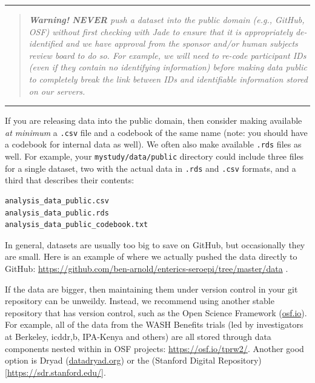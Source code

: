 \documentclass[
]{book}
\begin{document}
\begin{center}\rule{0.5\linewidth}{0.5pt}\end{center}

\begin{quote}
\emph{\textbf{Warning! } \textbf{NEVER} push a dataset into the public domain (e.g., GitHub, OSF) without first checking with Jade to ensure that it is appropriately de-identified and we have approval from the sponsor and/or human subjects review board to do so. For example, we will need to re-code participant IDs (even if they contain no identifying information) before making data public to completely break the link between IDs and identifiable information stored on our servers. }
\end{quote}

\begin{center}\rule{0.5\linewidth}{0.5pt}\end{center}

If you are releasing data into the public domain, then consider making available \emph{at minimum} a \texttt{.csv} file and a codebook of the same name (note: you should have a codebook for internal data as well). We often also make available \texttt{.rds} files as well. For example, your \texttt{mystudy/data/public} directory could include three files for a single dataset, two with the actual data in \texttt{.rds} and \texttt{.csv} formats, and a third that describes their contents:

\begin{verbatim}
analysis_data_public.csv
analysis_data_public.rds
analysis_data_public_codebook.txt
\end{verbatim}

In general, datasets are usually too big to save on GitHub, but occasionally they are small. Here is an example of where we actually pushed the data directly to GitHub: \url{https://github.com/ben-arnold/enterics-seroepi/tree/master/data} .

If the data are bigger, then maintaining them under version control in your git repository can be unweildy. Instead, we recommend using another stable repository that has version control, such as the Open Science Framework (\href{https://osf.io}{osf.io}). For example, all of the data from the WASH Benefits trials (led by investigators at Berkeley, icddr,b, IPA-Kenya and others) are all stored through data components nested within in OSF projects: \url{https://osf.io/tprw2/}. Another good option is Dryad (\href{https://datadryad.org/}{datadryad.org}) or the (Stanford Digital Repository){[}\url{https://sdr.stanford.edu/}{]}.
\end{document}
